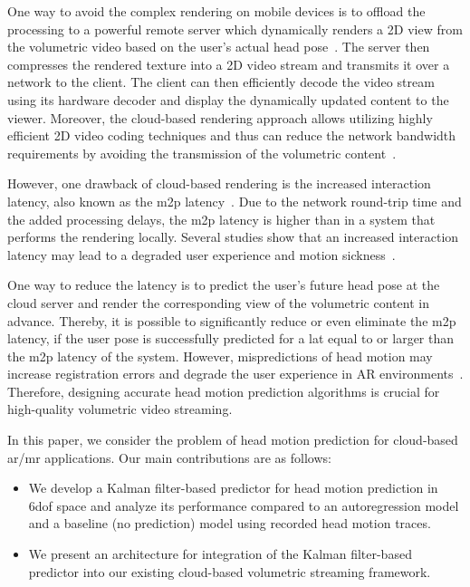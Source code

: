 \documentclass[sigconf]{acmart}			%
\begin{document}
One way to avoid the complex rendering on mobile devices is to offload the processing to a powerful remote server which dynamically renders a 2D view from the volumetric video based on the user's actual head pose~\cite{shi2015}. 
The server then compresses the rendered texture into a 2D video stream and transmits it over a network to the client.
The client can then efficiently decode the video stream using its hardware decoder and display the dynamically updated content to the viewer.
Moreover, the cloud-based rendering approach allows utilizing highly efficient 2D video coding techniques and thus can reduce the network bandwidth requirements by avoiding the transmission of the volumetric content~\cite{qian2019}.

However, one drawback of cloud-based rendering is the increased interaction latency, also known as the \gls{m2p} latency~\cite{shi2012}. 
Due to the network round-trip time and the added processing delays, the \gls{m2p} latency is higher than in a system that performs the rendering locally. 
Several studies show that an increased interaction latency may lead to a degraded user experience and motion sickness~\cite{beigbeder2004, mccandless2000, livingston2008}.

One way to reduce the latency is to predict the user's future head pose at the cloud server and render the corresponding view of the volumetric content in advance.
Thereby, it is possible to significantly reduce or even eliminate the \gls{m2p} latency, if the user pose is successfully predicted for a \gls{lat} equal to or larger than the \gls{m2p} latency of the system. 
However, mispredictions of head motion may increase registration errors and degrade the user experience in AR environments~\cite{livingston2008}. 
Therefore, designing accurate head motion prediction algorithms is crucial for high-quality volumetric video streaming.

In this paper, we consider the problem of head motion prediction for cloud-based \gls{ar}/\gls{mr} applications.
Our main contributions are as follows:
\begin{itemize}
	\item We develop a Kalman filter-based predictor for head motion prediction in \gls{6dof} space and analyze its performance compared to an autoregression model and a baseline (no prediction) model using recorded head motion traces.
	\item We present an architecture for integration of the Kalman filter-based predictor into our existing cloud-based volumetric streaming framework.
\end{itemize}
\end{document}
